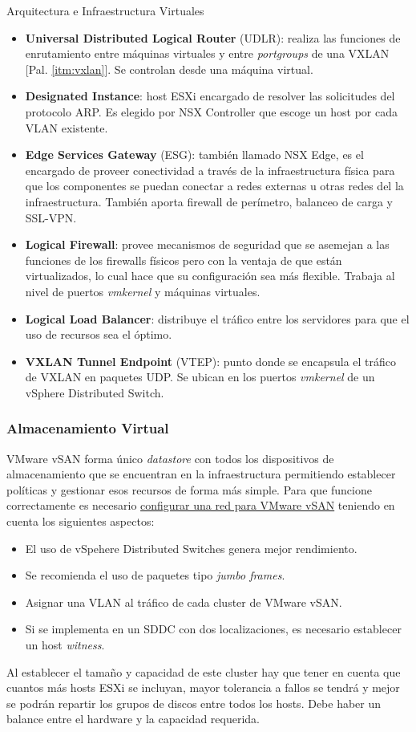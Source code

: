 \begin{subsection}{Arquitectura e Infraestructura Virtuales\cite{CFVirtInfraes}}
\begin{itemize}
    \item \textbf{Universal Distributed Logical Router} (UDLR): realiza las funciones de enrutamiento entre máquinas virtuales y entre \textit{portgroups} de una VXLAN [Pal. \ref{itm:vxlan}]. Se controlan desde una máquina virtual. 
    \item \textbf{Designated Instance}: host ESXi encargado de resolver las solicitudes del protocolo ARP. Es elegido por NSX Controller que escoge un host por cada VLAN existente.
    \item \textbf{Edge Services Gateway} (ESG): también llamado NSX Edge, es el encargado de proveer conectividad a través de la infraestructura física para que los componentes se puedan conectar a redes externas u otras redes del la infraestructura. También aporta firewall de perímetro, balanceo de carga y SSL-VPN.
    \item \textbf{Logical Firewall}: provee mecanismos de seguridad que se asemejan a las funciones de los firewalls físicos pero con la ventaja de que están virtualizados, lo cual hace que su configuración sea más flexible. Trabaja al nivel de puertos \textit{vmkernel} y máquinas virtuales.
    \item \textbf{Logical Load Balancer}: distribuye el tráfico entre los servidores para que el uso de recursos sea el óptimo.
    \item \textbf{VXLAN Tunnel Endpoint} (VTEP): punto donde se encapsula el tráfico de VXLAN en paquetes UDP. Se ubican en los puertos \textit{vmkernel} de un vSphere Distributed Switch.
\end{itemize}
\fi

\iffalse
\subsubsection{Almacenamiento Virtual}
VMware vSAN forma único \textit{datastore} con todos los dispositivos de almacenamiento que se encuentran en la infraestructura permitiendo establecer políticas y gestionar esos recursos de forma más simple. Para que funcione correctamente es necesario \underline{configurar una red para VMware vSAN} teniendo en cuenta los siguientes aspectos:
\begin{itemize}
    \item El uso de vSpehere Distributed Switches genera mejor rendimiento.
    \item Se recomienda el uso de paquetes tipo \textit{jumbo frames}.
    \item Asignar una VLAN al tráfico de cada cluster de VMware vSAN.
    \item Si se implementa en un SDDC con dos localizaciones, es necesario establecer un host \textit{witness}.
\end{itemize}
Al establecer el tamaño y capacidad de este cluster hay que tener en cuenta que cuantos más hosts ESXi se incluyan, mayor tolerancia a fallos se tendrá y mejor se podrán repartir los grupos de discos entre todos los hosts. Debe haber un balance entre el hardware y la capacidad requerida.



\end{subsection}

